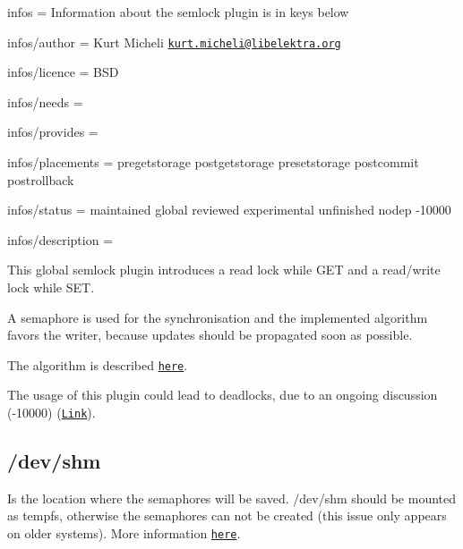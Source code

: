 
\begin{DoxyItemize}
\item infos = Information about the semlock plugin is in keys below
\item infos/author = Kurt Micheli \href{mailto:kurt.micheli@libelektra.org}{\tt kurt.\+micheli@libelektra.\+org}
\item infos/licence = B\+S\+D
\item infos/needs =
\item infos/provides =
\item infos/placements = pregetstorage postgetstorage presetstorage postcommit postrollback
\item infos/status = maintained global reviewed experimental unfinished nodep -\/10000
\item infos/description =
\end{DoxyItemize}

This global semlock plugin introduces a read lock while {\ttfamily G\+E\+T} and a read/write lock while {\ttfamily S\+E\+T}.

A semaphore is used for the synchronisation and the implemented algorithm favors the writer, because updates should be propagated soon as possible.

The algorithm is described \href{https://en.wikipedia.org/wiki/Readers%E2%80%93writers_problem#Second_readers-writers_problem}{\tt here}.

The usage of this plugin could lead to deadlocks, due to an ongoing discussion (-\/10000) (\href{https://github.com/ElektraInitiative/libelektra/pull/555}{\tt Link}).

\subsection*{/dev/shm}

Is the location where the semaphores will be saved. {\ttfamily /dev/shm} should be mounted as tempfs, otherwise the semaphores can not be created (this issue only appears on older systems). More information \href{http://stackoverflow.com/questions/270113/how-do-i-stop-sem-open-failing-with-enosys}{\tt here}. 
